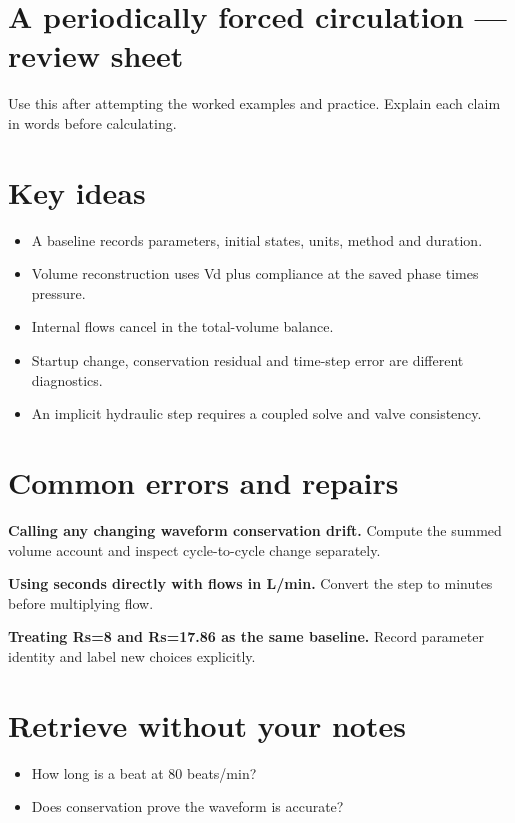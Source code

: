 \documentclass[11pt,letterpaper]{article}
\theoremstyle{definition}\newtheorem{definition}{Definition}\newtheorem{example}{Example}
\numberwithin{equation}{section}
\begin{document}
\section*{A periodically forced circulation --- review sheet}
Use this after attempting the worked examples and practice. Explain each claim in words before calculating.

\section*{Key ideas}
\begin{itemize}
\item A baseline records parameters, initial states, units, method and duration.
\item Volume reconstruction uses Vd plus compliance at the saved phase times pressure.
\item Internal flows cancel in the total-volume balance.
\item Startup change, conservation residual and time-step error are different diagnostics.
\item An implicit hydraulic step requires a coupled solve and valve consistency.
\end{itemize}
\section*{Common errors and repairs}
\textbf{Calling any changing waveform conservation drift.} Compute the summed volume account and inspect cycle-to-cycle change separately.

\textbf{Using seconds directly with flows in L/min.} Convert the step to minutes before multiplying flow.

\textbf{Treating Rs=\allowbreak{}8 and Rs=\allowbreak{}17.86 as the same baseline.} Record parameter identity and label new choices explicitly.

\section*{Retrieve without your notes}
\begin{itemize}
\item How long is a beat at 80 beats/min?
\item Does conservation prove the waveform is accurate?
\end{itemize}
\end{document}
